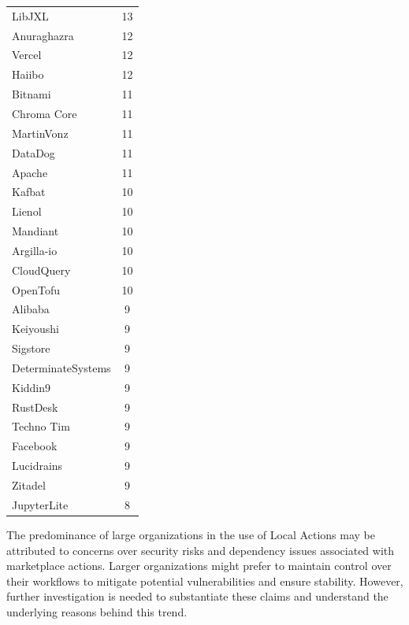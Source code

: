 \documentclass[conference]{IEEEtran}
\begin{document}
\begin{table}[h]
\begin{tabular}{|l|c|}
              LibJXL & 13 \\
              Anuraghazra & 12 \\
              Vercel & 12 \\
              Haiibo & 12 \\
              Bitnami & 11 \\
              Chroma Core & 11 \\
              MartinVonz & 11 \\
              DataDog & 11 \\
              Apache & 11 \\
              Kafbat & 10 \\
              Lienol & 10 \\
              Mandiant & 10 \\
              Argilla-io & 10 \\
              CloudQuery & 10 \\
              OpenTofu & 10 \\
              Alibaba & 9 \\
              Keiyoushi & 9 \\
              Sigstore & 9 \\
              DeterminateSystems & 9 \\
              Kiddin9 & 9 \\
              RustDesk & 9 \\
              Techno Tim & 9 \\
              Facebook & 9 \\
              Lucidrains & 9 \\
              Zitadel & 9 \\
              JupyterLite & 8 \\
              \hline
          \end{tabular}
      \end{table}
      
      The predominance of large organizations in the use of Local Actions may be attributed to concerns over security risks and dependency issues associated with marketplace actions. Larger organizations might prefer to maintain control over their workflows to mitigate potential vulnerabilities and ensure stability. However, further investigation is needed to substantiate these claims and understand the underlying reasons behind this trend.
      
\end{document}
